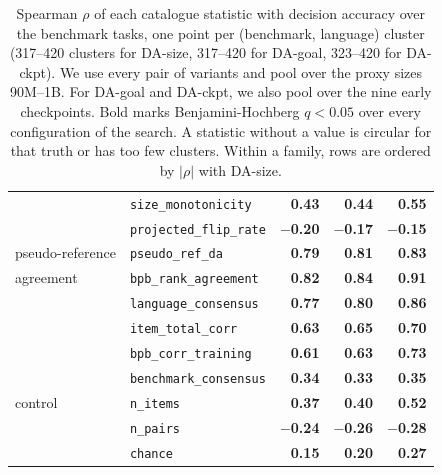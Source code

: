\begin{table}[h]
\begin{tabular}{@{}llrrr@{}}
 & \texttt{size\_monotonicity} & \textbf{0.43} & \textbf{0.44} & \textbf{0.55} \\
 & \texttt{projected\_flip\_rate} & \textbf{$-$0.20} & \textbf{$-$0.17} & \textbf{$-$0.15} \\
\midrule
pseudo-reference & \texttt{pseudo\_ref\_da} & \textbf{0.79} & \textbf{0.81} & \textbf{0.83} \\
\midrule
agreement & \texttt{bpb\_rank\_agreement} & \textbf{0.82} & \textbf{0.84} & \textbf{0.91} \\
 & \texttt{language\_consensus} & \textbf{0.77} & \textbf{0.80} & \textbf{0.86} \\
 & \texttt{item\_total\_corr} & \textbf{0.63} & \textbf{0.65} & \textbf{0.70} \\
 & \texttt{bpb\_corr\_training} & \textbf{0.61} & \textbf{0.63} & \textbf{0.73} \\
 & \texttt{benchmark\_consensus} & \textbf{0.34} & \textbf{0.33} & \textbf{0.35} \\
\midrule
control & \texttt{n\_items} & \textbf{0.37} & \textbf{0.40} & \textbf{0.52} \\
 & \texttt{n\_pairs} & \textbf{$-$0.24} & \textbf{$-$0.26} & \textbf{$-$0.28} \\
 & \texttt{chance} & \textbf{0.15} & \textbf{0.20} & \textbf{0.27} \\
\bottomrule
\end{tabular}
\caption{Spearman $\rho$ of each catalogue statistic with decision accuracy over the benchmark tasks, one point per (benchmark, language) cluster (317--420 clusters for DA-size, 317--420 for DA-goal, 323--420 for DA-ckpt). We use every pair of variants and pool over the proxy sizes 90M--1B. For DA-goal and DA-ckpt, we also pool over the nine early checkpoints. Bold marks Benjamini-Hochberg $q < 0.05$ over every configuration of the search. A statistic without a value is circular for that truth or has too few clusters. Within a family, rows are ordered by $|\rho|$ with DA-size. }
\label{tab:sur-corr-catalogue}
\end{table}

